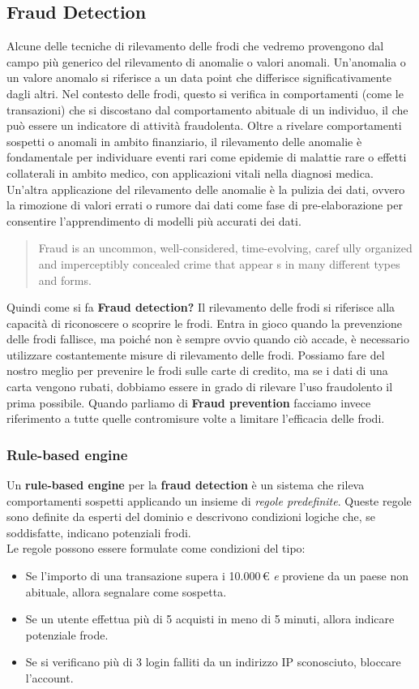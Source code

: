 \subsection{Fraud Detection}
Alcune delle tecniche di rilevamento delle frodi che vedremo provengono dal campo più generico del rilevamento di anomalie o valori anomali. Un'anomalia o un valore anomalo si riferisce a un data point che differisce significativamente dagli altri. Nel contesto delle frodi, questo si verifica in comportamenti (come le transazioni) che si discostano dal comportamento abituale di un individuo, il che può essere un indicatore di attività fraudolenta. Oltre a rivelare comportamenti sospetti o anomali in ambito finanziario, il rilevamento delle anomalie è fondamentale per individuare eventi rari come epidemie di malattie rare o effetti collaterali in ambito medico, con applicazioni vitali nella diagnosi medica. Un'altra applicazione del rilevamento delle anomalie è la pulizia dei dati, ovvero la rimozione di valori errati o rumore dai dati come fase di pre-elaborazione per consentire l'apprendimento di modelli più accurati dei dati.
\begin{quote}
    Fraud is an uncommon, well-considered, time-evolving, caref
ully organized and imperceptibly concealed crime that appear
s in many different types and forms.
\end{quote}
Quindi come si fa \textbf{Fraud detection?} Il rilevamento delle frodi si riferisce alla capacità di riconoscere o scoprire le frodi. Entra in gioco quando la prevenzione delle frodi fallisce, ma poiché non è sempre ovvio quando ciò accade, è necessario utilizzare costantemente misure di rilevamento delle frodi. Possiamo fare del nostro meglio per prevenire le frodi sulle carte di credito, ma se i dati di una carta vengono rubati, dobbiamo essere in grado di rilevare l'uso fraudolento il prima possibile. Quando parliamo di \textbf{Fraud prevention} facciamo invece riferimento a tutte quelle contromisure volte a limitare l'efficacia delle frodi. 
\subsubsection*{Rule-based engine}
Un \textbf{rule-based engine} per la \textbf{fraud detection} è un sistema che rileva comportamenti sospetti applicando un insieme di \emph{regole predefinite}. Queste regole sono definite da esperti del dominio e descrivono condizioni logiche che, se soddisfatte, indicano potenziali frodi.
\\
Le regole possono essere formulate come condizioni del tipo:
\begin{itemize}
  \item Se l'importo di una transazione supera i 10.000\,€ \emph{e} proviene da un paese non abituale, allora segnalare come sospetta.
  \item Se un utente effettua più di 5 acquisti in meno di 5 minuti, allora indicare potenziale frode.
  \item Se si verificano più di 3 login falliti da un indirizzo IP sconosciuto, bloccare l'account.
\end{itemize}

